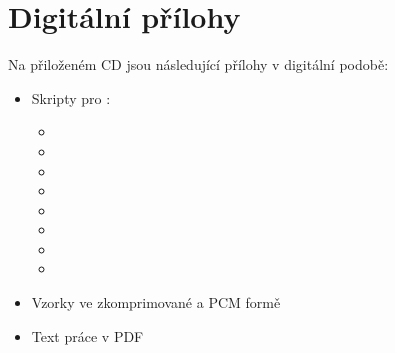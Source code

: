 \chapter{Digitální přílohy}
\label{app:1}

Na přiloženém CD jsou následující přílohy v digitální podobě:

\begin{itemize}
    \item Skripty pro \matlab:
    \begin{itemize}
        \item {}
        \item {}
        \item {}
        \item {}
        \item {}
        \item {}
        \item {}
        \item {}
    \end{itemize}
    
    \item Vzorky ve zkomprimované a PCM formě
    \item Text práce v PDF
\end{itemize}